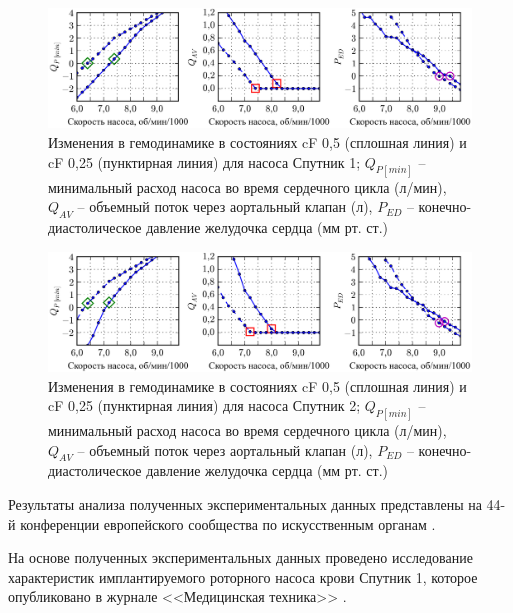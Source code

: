\begin{figure}[!ht] 
  \center
  \includegraphics [scale=1.0] {../images/c4_ps_sputnik_1}
  \caption{Изменения в гемодинамике в состояниях cF 0,5 (сплошная линия) и cF 0,25 (пунктирная линия) для насоса Спутник 1; $Q_{P[min]}$ -- минимальный расход насоса во время сердечного цикла (л/мин), $Q_{AV}$ -- объемный поток через аортальный клапан (л), $P_{ED}$ -- конечно-диастолическое давление желудочка сердца (мм рт. ст.)} 
  \label{img:ps_sputnik_1}  
\end{figure}

\begin{figure}[!ht] 
  \center
  \includegraphics [scale=1.0] {../images/c4_ps_sputnik_2}
  \caption{Изменения в гемодинамике в состояниях cF 0,5 (сплошная линия) и cF 0,25 (пунктирная линия) для насоса Спутник 2; $Q_{P[min]}$ -- минимальный расход насоса во время сердечного цикла (л/мин), $Q_{AV}$ -- объемный поток через аортальный клапан (л), $P_{ED}$ -- конечно-диастолическое давление желудочка сердца (мм рт. ст.)} 
  \label{img:ps_sputnik_2}  
\end{figure}

Результаты анализа полученных экспериментальных данных представлены на 44-й конференции европейского сообщества по искусственным органам \cite{esao_2017}.

На основе полученных экспериментальных данных проведено исследование характеристик имплантируемого роторного насоса крови Спутник 1, которое опубликовано в журнале <<Медицинская техника>> \cite{mt6_2015, mt6_2016}.



